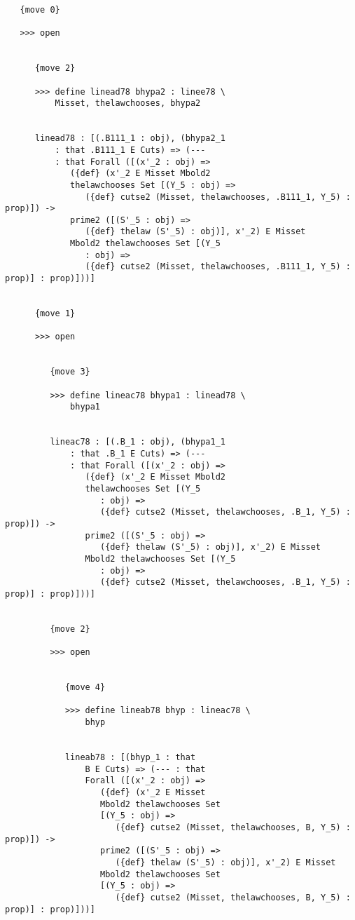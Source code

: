 \documentclass[12pt]{article}
\begin{document}
\begin{verbatim}
   {move 0}

   >>> open


      {move 2}

      >>> define linead78 bhypa2 : linee78 \
          Misset, thelawchooses, bhypa2


      linead78 : [(.B111_1 : obj), (bhypa2_1 
          : that .B111_1 E Cuts) => (--- 
          : that Forall ([(x'_2 : obj) => 
             ({def} (x'_2 E Misset Mbold2 
             thelawchooses Set [(Y_5 : obj) => 
                ({def} cutse2 (Misset, thelawchooses, .B111_1, Y_5) : prop)]) -> 
             prime2 ([(S'_5 : obj) => 
                ({def} thelaw (S'_5) : obj)], x'_2) E Misset 
             Mbold2 thelawchooses Set [(Y_5 
                : obj) => 
                ({def} cutse2 (Misset, thelawchooses, .B111_1, Y_5) : prop)] : prop)]))]


      {move 1}

      >>> open


         {move 3}

         >>> define lineac78 bhypa1 : linead78 \
             bhypa1


         lineac78 : [(.B_1 : obj), (bhypa1_1 
             : that .B_1 E Cuts) => (--- 
             : that Forall ([(x'_2 : obj) => 
                ({def} (x'_2 E Misset Mbold2 
                thelawchooses Set [(Y_5 
                   : obj) => 
                   ({def} cutse2 (Misset, thelawchooses, .B_1, Y_5) : prop)]) -> 
                prime2 ([(S'_5 : obj) => 
                   ({def} thelaw (S'_5) : obj)], x'_2) E Misset 
                Mbold2 thelawchooses Set [(Y_5 
                   : obj) => 
                   ({def} cutse2 (Misset, thelawchooses, .B_1, Y_5) : prop)] : prop)]))]


         {move 2}

         >>> open


            {move 4}

            >>> define lineab78 bhyp : lineac78 \
                bhyp


            lineab78 : [(bhyp_1 : that 
                B E Cuts) => (--- : that 
                Forall ([(x'_2 : obj) => 
                   ({def} (x'_2 E Misset 
                   Mbold2 thelawchooses Set 
                   [(Y_5 : obj) => 
                      ({def} cutse2 (Misset, thelawchooses, B, Y_5) : prop)]) -> 
                   prime2 ([(S'_5 : obj) => 
                      ({def} thelaw (S'_5) : obj)], x'_2) E Misset 
                   Mbold2 thelawchooses Set 
                   [(Y_5 : obj) => 
                      ({def} cutse2 (Misset, thelawchooses, B, Y_5) : prop)] : prop)]))]



\end{verbatim}
\end{document}
